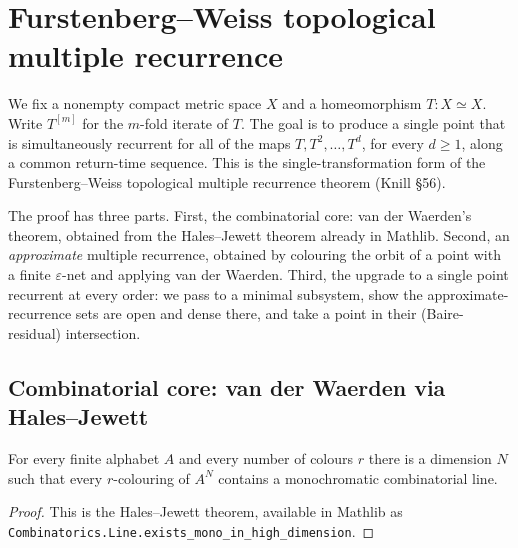 


\section{Furstenberg--Weiss topological multiple recurrence}

We fix a nonempty compact metric space $X$ and a homeomorphism
$T : X \simeq X$. Write $T^{[m]}$ for the $m$-fold iterate of $T$. The goal is
to produce a single point that is simultaneously recurrent for all of the maps
$T, T^2, \dots, T^d$, for every $d \ge 1$, along a common return-time sequence.
This is the single-transformation form of the Furstenberg--Weiss topological
multiple recurrence theorem (Knill \S56).

The proof has three parts. First, the combinatorial core: van der Waerden's
theorem, obtained from the Hales--Jewett theorem already in Mathlib. Second, an
\emph{approximate} multiple recurrence, obtained by colouring the orbit of a
point with a finite $\varepsilon$-net and applying van der Waerden. Third, the
upgrade to a single point recurrent at every order: we pass to a minimal
subsystem, show the approximate-recurrence sets are open and dense there, and
take a point in their (Baire-residual) intersection.

\subsection{Combinatorial core: van der Waerden via Hales--Jewett}

\begin{lemma}
    \label{lem:hales-jewett}
    \leanok
    For every finite alphabet $A$ and every number of colours $r$ there is a
    dimension $N$ such that every $r$-colouring of $A^N$ contains a
    monochromatic combinatorial line.
\end{lemma}
\begin{proof}
    This is the Hales--Jewett theorem, available in Mathlib as
    \texttt{Combinatorics.Line.exists\_mono\_in\_high\_dimension}.
\end{proof}

